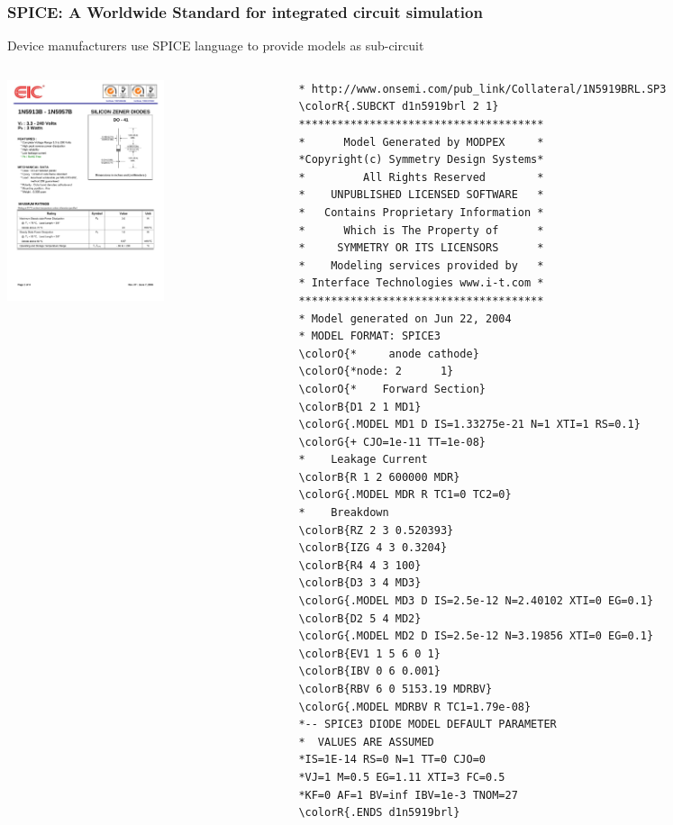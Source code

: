 \begin{frame}[fragile]
  \frametitle{SPICE: A Worldwide Standard for integrated circuit simulation}
  \centerline{Device manufacturers use SPICE language to provide models as sub-circuit}
  \begin{columns}
    \begin{column}{.5\textwidth}
      \begin{center}
        \includegraphics[height=65mm]{figures/1N5919B-1.pdf}
      \end{center}
    \end{column}
    \begin{column}{.5\textwidth}
      \begin{center}
        \fontsize{4.25pt}{4.25pt}\selectfont
\begin{Verbatim}[commandchars=\\\{\}]
* http://www.onsemi.com/pub_link/Collateral/1N5919BRL.SP3
\colorR{.SUBCKT d1n5919brl 2 1}
**************************************
*      Model Generated by MODPEX     *
*Copyright(c) Symmetry Design Systems*
*         All Rights Reserved        *
*    UNPUBLISHED LICENSED SOFTWARE   *
*   Contains Proprietary Information *
*      Which is The Property of      *
*     SYMMETRY OR ITS LICENSORS      *
*    Modeling services provided by   *
* Interface Technologies www.i-t.com *
**************************************
* Model generated on Jun 22, 2004
* MODEL FORMAT: SPICE3
\colorO{*     anode cathode}
\colorO{*node: 2      1}
\colorO{*    Forward Section}
\colorB{D1 2 1 MD1}
\colorG{.MODEL MD1 D IS=1.33275e-21 N=1 XTI=1 RS=0.1}
\colorG{+ CJO=1e-11 TT=1e-08}
*    Leakage Current
\colorB{R 1 2 600000 MDR}
\colorG{.MODEL MDR R TC1=0 TC2=0}
*    Breakdown
\colorB{RZ 2 3 0.520393}
\colorB{IZG 4 3 0.3204}
\colorB{R4 4 3 100}
\colorB{D3 3 4 MD3}
\colorG{.MODEL MD3 D IS=2.5e-12 N=2.40102 XTI=0 EG=0.1}
\colorB{D2 5 4 MD2}
\colorG{.MODEL MD2 D IS=2.5e-12 N=3.19856 XTI=0 EG=0.1}
\colorB{EV1 1 5 6 0 1}
\colorB{IBV 0 6 0.001}
\colorB{RBV 6 0 5153.19 MDRBV}
\colorG{.MODEL MDRBV R TC1=1.79e-08}
*-- SPICE3 DIODE MODEL DEFAULT PARAMETER
*  VALUES ARE ASSUMED
*IS=1E-14 RS=0 N=1 TT=0 CJO=0
*VJ=1 M=0.5 EG=1.11 XTI=3 FC=0.5
*KF=0 AF=1 BV=inf IBV=1e-3 TNOM=27
\colorR{.ENDS d1n5919brl}
\end{Verbatim}
        \normalsize
      \end{center}
    \end{column}
  \end{columns}
\end{frame}

